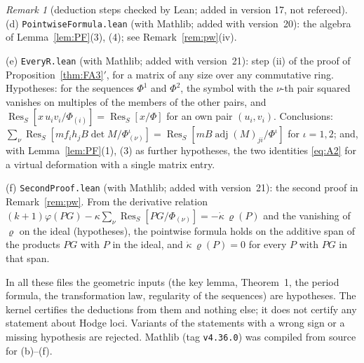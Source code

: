 \documentclass[11pt]{article}
\numberwithin{equation}{section}
\newcommand{\allr}{\ref{thm:FA3}$'$}
\theoremstyle{remark}
\newtheorem{remark}[theorem]{Remark}
\newcommand{\Res}{\operatorname{Res}}
\begin{document}
\begin{remark}[deduction steps checked by Lean; added in version 17, not refereed]
(d) \texttt{PointwiseFormula.lean} (with Mathlib; added with version~20): the algebra of
Lemma~\ref{lem:PF}(3), (4); see Remark~\ref{rem:pw}(iv).

(e) \texttt{EveryR.lean} (with Mathlib; added with version~21): step (ii) of the proof of Proposition~\allr, for a
matrix of any size over any commutative ring. Hypotheses: for the sequences $\Phi^1$ and $\Phi^2$, the symbol with
the $\nu$-th pair squared vanishes on multiples of the members of the other pairs, and
$\Res_S[x\,u_iv_i/\Phi_{(i)}]=\Res_S[x/\Phi]$ for an own pair $(u_i,v_i)$. Conclusions:
$\sum_\nu\Res_S[m f_ih_jB\det M/\Phi^\iota_{(\nu)}]=\Res_S[mB\operatorname{adj}(M)_{ji}/\Phi^\iota]$ for $\iota=1,2$; and, with
Lemma~\ref{lem:PF}(1), (3) as further hypotheses, the two identities \eqref{eq:A2} for a virtual deformation with a
single matrix entry.

(f) \texttt{SecondProof.lean} (with Mathlib; added with version~21): the second proof in Remark~\ref{rem:pw}. From
the derivative relation $(k+1)\varphi(PG)-\kappa\sum_\nu\Res_S[PG/\Phi_{(\nu)}]=-\dot\kappa\,\varrho(P)$ and the vanishing
of $\varrho$ on the ideal (hypotheses), the pointwise formula holds on the additive span of the products $PG$ with
$P$ in the ideal, and $\dot\kappa\,\varrho(P)=0$ for every $P$ with $PG$ in that span.

In all these files the geometric inputs (the key lemma, Theorem~1, the period formula, the transformation law,
regularity of the sequences) are hypotheses. The kernel certifies the deductions from them and nothing else; it
does not certify any statement about Hodge loci. Variants of the statements with a wrong sign or a missing
hypothesis are rejected. Mathlib (tag \texttt{v4.36.0}) was compiled from source for (b)--(f).
\end{remark}
\end{document}
